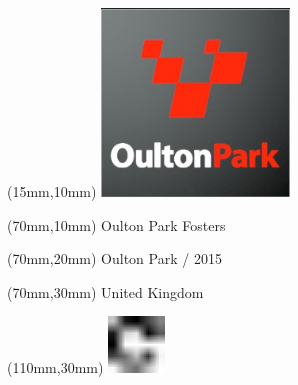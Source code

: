 \null\newpage
\begin{textblock*}{50mm}(15mm,10mm)%
\includegraphics[width=50mm]{LG/2015-05-20_00091.png}
\end{textblock*}
\begin{textblock*}{130mm}(70mm,10mm)%
{\fontsize{20}{20}\selectfont Oulton Park Fosters}\\
\end{textblock*}
\begin{textblock*}{120mm}(70mm,20mm)%
{\fontsize{16}{16}\selectfont Oulton Park / 2015}\\
\end{textblock*}
\begin{textblock*}{120mm}(70mm,30mm)%
{\fontsize{12}{12}\selectfont United Kingdom}
\end{textblock*}
\begin{textblock*}{30mm}(110mm,30mm)%
\centering
\includegraphics[height=15mm]{icons/fa-rotate-right.pdf}
\end{textblock*}
